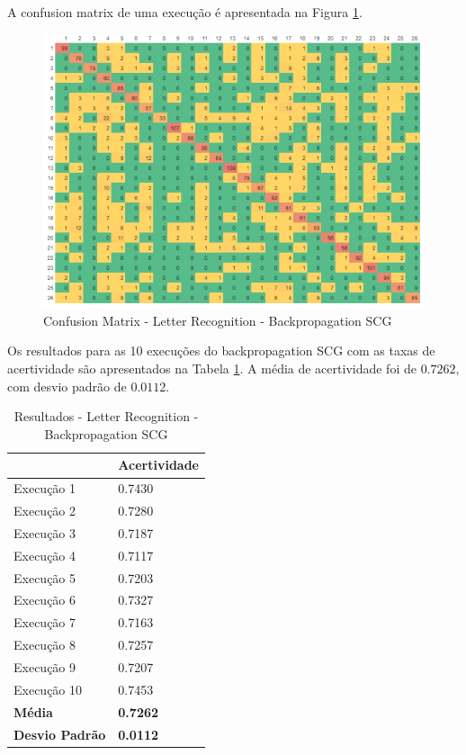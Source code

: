 A confusion matrix de uma execução é apresentada na Figura \ref{figura-confusion-matrix-letter-recognition-backpropagation-scg}.

\begin{figure}[h!]
  \includegraphics[width=\linewidth]{figs/confusion-matrix-letter-recognition-backpropagation-scg.png}
  \caption{Confusion Matrix - Letter Recognition - Backpropagation SCG}
  \label{figura-confusion-matrix-letter-recognition-backpropagation-scg}
\end{figure}

Os resultados para as 10 execuções do backpropagation SCG com as taxas de acertividade são apresentados na Tabela \ref{tabela-resultado-letter-recognition-scg}. A média de acertividade foi de $0.7262$, com desvio padrão de $0.0112$.

\begin{table}[h!]
\centering
\caption{Resultados - Letter Recognition - Backpropagation SCG}
\label{tabela-resultado-letter-recognition-scg}
\begin{tabular}{ll}
\toprule
                       & \textbf{Acertividade}       \\ \midrule
Execução 1             & 0.7430          \\
Execução 2             & 0.7280          \\
Execução 3             & 0.7187           \\
Execução 4             & 0.7117          \\
Execução 5             & 0.7203           \\
Execução 6             & 0.7327          \\
Execução 7             & 0.7163           \\
Execução 8             & 0.7257           \\
Execução 9             & 0.7207          \\
Execução 10            & 0.7453          \\ \bottomrule
\textbf{Média}         & \textbf{0.7262} \\
\textbf{Desvio Padrão} & \textbf{0.0112}
\end{tabular}
\end{table}

